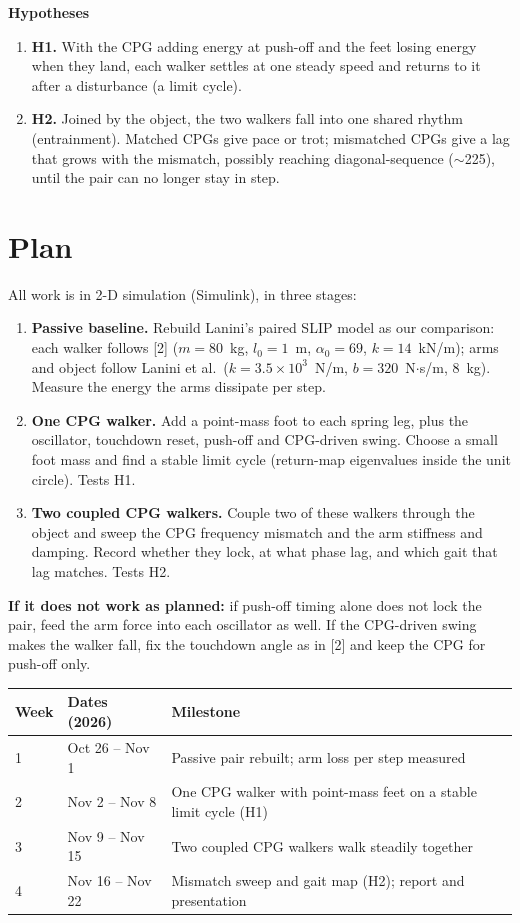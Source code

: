 \documentclass[11pt]{article}
\begin{document}
\textbf{Hypotheses}
\begin{enumerate}
  \item \textbf{H1.} With the CPG adding energy at push-off and the feet losing energy when they land, each walker settles at one steady speed and returns to it after a disturbance (a limit cycle).
  \item \textbf{H2.} Joined by the object, the two walkers fall into one shared rhythm (entrainment). Matched CPGs give pace or trot; mismatched CPGs give a lag that grows with the mismatch, possibly reaching diagonal-sequence ($\sim$225\textdegree{}), until the pair can no longer stay in step.
\end{enumerate}

\section*{Plan}

All work is in 2-D simulation (Simulink), in three stages:
\begin{enumerate}
  \item \textbf{Passive baseline.} Rebuild Lanini's paired SLIP model as our comparison: each walker follows [2] ($m = 80$~kg, $l_0 = 1$~m, $\alpha_0 = 69$\textdegree{}, $k = 14$~kN/m); arms and object follow Lanini et al.\ ($k = 3.5\times10^3$~N/m, $b = 320$~N$\cdot$s/m, 8~kg). Measure the energy the arms dissipate per step.
  \item \textbf{One CPG walker.} Add a point-mass foot to each spring leg, plus the oscillator, touchdown reset, push-off and CPG-driven swing. Choose a small foot mass and find a stable limit cycle (return-map eigenvalues inside the unit circle). Tests H1.
  \item \textbf{Two coupled CPG walkers.} Couple two of these walkers through the object and sweep the CPG frequency mismatch and the arm stiffness and damping. Record whether they lock, at what phase lag, and which gait that lag matches. Tests H2.
\end{enumerate}

\textbf{If it does not work as planned:} if push-off timing alone does not lock the pair, feed the arm force into each oscillator as well. If the CPG-driven swing makes the walker fall, fix the touchdown angle as in [2] and keep the CPG for push-off only.

\vspace{2pt}
\begin{tabular}{@{}l l p{}@{}}
\toprule
\textbf{Week} & \textbf{Dates (2026)} & \textbf{Milestone} \\
\midrule
1 & Oct 26 -- Nov 1  & Passive pair rebuilt; arm loss per step measured \\
2 & Nov 2 -- Nov 8   & One CPG walker with point-mass feet on a stable limit cycle (H1) \\
3 & Nov 9 -- Nov 15  & Two coupled CPG walkers walk steadily together \\
4 & Nov 16 -- Nov 22 & Mismatch sweep and gait map (H2); report and presentation \\
\bottomrule
\end{tabular}
\end{document}
